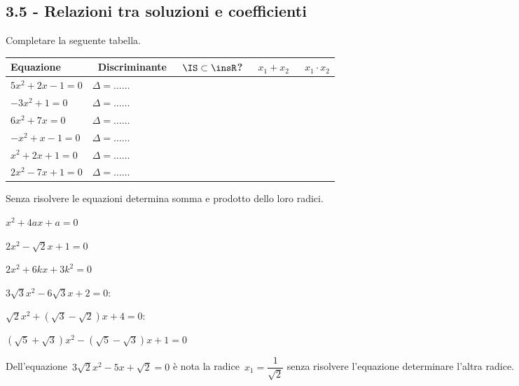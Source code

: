 \subsection*{3.5 - Relazioni tra soluzioni e coefficienti}

\begin{esercizio}
 \label{ese:3.67}
Completare la seguente tabella.

 \begin{tabular*}{.9\textwidth}{@{\extracolsep{\fill}}*{5}{l}}
 \toprule
 Equazione &~Discriminante&~$\IS\subset\insR$? &~$x_1 + x_2$ &~$x_1 \cdot 
x_2$\\
\midrule
$5 x^{2} + 2 x-1 = 0$&$\Delta=\ldots \ldots$ & & &\\
$- 3 x^{2} + 1 = 0$&$\Delta=\ldots \ldots$ & & &\\
$6 x^{2} + 7 x = 0$&$\Delta=\ldots \ldots$ & & &\\
$- x^{2} + x-1 = 0$&$\Delta=\ldots \ldots$ & & &\\
$x^{2} + 2 x + 1 = 0$&$\Delta=\ldots \ldots$ & & &\\
$2 x^{2}-7 x + 1 = 0$&$\Delta=\ldots \ldots$ & & &\\
\bottomrule
 \end{tabular*}

\end{esercizio}

\begin{esercizio}
 \label{ese:3.68}
Senza risolvere le equazioni determina somma e prodotto dello loro radici.
\begin{multicols}{2}
\begin{enumeratea}
\item$x^{2} + 4ax + a = 0$
\item$2x^{2}-\sqrt{2} x + 1 = 0$
\item$2x^{2} + 6kx + 3k^{2} = 0$
\item$3 \sqrt{3} x^{2}-6 \sqrt{3} x + 2 = 0$:
\item$\sqrt{2} x^{2} + (\sqrt{3}-\sqrt{2}) x + 4 = 0$:
\item$(\sqrt{5} + \sqrt{3}) x^{2}-(\sqrt{5}-\sqrt{3}) x + 1= 0$
\end{enumeratea}
\end{multicols}
\end{esercizio}

\begin{esercizio}
 \label{ese:3.69}
Dell'equazione~$3 \sqrt{2} x^{2}-5 x + \sqrt{2} = 0$ 
è nota la radice~$x_{1} = \dfrac{1}{\sqrt{2}}$ 
senza risolvere l'equazione determinare l'altra radice.
\end{esercizio}

